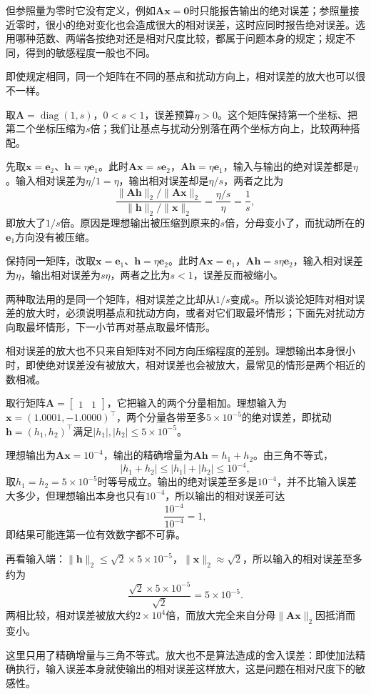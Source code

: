 但参照量为零时它没有定义，例如$\bm A\bm x=\bm0$时只能报告输出的绝对误差；参照量接近零时，很小的绝对变化也会造成很大的相对误差，这时应同时报告绝对误差。选用哪种范数、两端各按绝对还是相对尺度比较，都属于问题本身的规定；规定不同，得到的敏感程度一般也不同。

即使规定相同，同一个矩阵在不同的基点和扰动方向上，相对误差的放大也可以很不一样。
\begin{example}[对角矩阵的两种基点]
\label{ex:ls-diagonal-relative-error-basepoints}
取$\bm A=\operatorname{diag}(1,s)$，$0<s<1$，误差预算$\eta>0$。这个矩阵保持第一个坐标、把第二个坐标压缩为$s$倍；我们让基点与扰动分别落在两个坐标方向上，比较两种搭配。

先取$\bm x=\bm e_2$、$\bm h=\eta\bm e_1$。此时$\bm A\bm x=s\bm e_2$，$\bm A\bm h=\eta\bm e_1$，输入与输出的绝对误差都是$\eta$。输入相对误差为$\eta/1=\eta$，输出相对误差却是$\eta/s$，两者之比为
\[
 \frac{\lVert\bm A\bm h\rVert_2/\lVert\bm A\bm x\rVert_2}{\lVert\bm h\rVert_2/\lVert\bm x\rVert_2}
 =\frac{\eta/s}{\eta}=\frac1s ,
\]
即放大了$1/s$倍。原因是理想输出被压缩到原来的$s$倍，分母变小了，而扰动所在的$\bm e_1$方向没有被压缩。

保持同一矩阵，改取$\bm x=\bm e_1$、$\bm h=\eta\bm e_2$。此时$\bm A\bm x=\bm e_1$，$\bm A\bm h=s\eta\bm e_2$，输入相对误差为$\eta$，输出相对误差为$s\eta$，两者之比为$s<1$，误差反而被缩小。
\end{example}
两种取法用的是同一个矩阵，相对误差之比却从$1/s$变成$s$。所以谈论矩阵对相对误差的放大时，必须说明基点和扰动方向，或者对它们取最坏情形；下面先对扰动方向取最坏情形，下一小节再对基点取最坏情形。

相对误差的放大也不只来自矩阵对不同方向压缩程度的差别。理想输出本身很小时，即使绝对误差没有被放大，相对误差也会被放大，最常见的情形是两个相近的数相减。
\begin{example}[加法中的抵消]
\label{ex:ls-cancellation-relative-error}
取行矩阵$\bm A=\begin{bmatrix}1&1\end{bmatrix}$，它把输入的两个分量相加。理想输入为$\bm x=(1.0001,-1.0000)^\top$，两个分量各带至多$5\times10^{-5}$的绝对误差，即扰动$\bm h=(h_1,h_2)^\top$满足$|h_1|,|h_2|\leq5\times10^{-5}$。

理想输出为$\bm A\bm x=10^{-4}$，输出的精确增量为$\bm A\bm h=h_1+h_2$。由三角不等式，
\[
 |h_1+h_2|\leq|h_1|+|h_2|\leq10^{-4},
\]
取$h_1=h_2=5\times10^{-5}$时等号成立。输出的绝对误差至多是$10^{-4}$，并不比输入误差大多少，但理想输出本身也只有$10^{-4}$，所以输出的相对误差可达
\[
 \frac{10^{-4}}{10^{-4}}=1 ,
\]
即结果可能连第一位有效数字都不可靠。

再看输入端：$\lVert\bm h\rVert_2\leq\sqrt2\times5\times10^{-5}$，$\lVert\bm x\rVert_2\approx\sqrt2$，所以输入的相对误差至多约为
\[
 \frac{\sqrt2\times5\times10^{-5}}{\sqrt2}=5\times10^{-5}.
\]
两相比较，相对误差被放大约$2\times10^4$倍，而放大完全来自分母$\lVert\bm A\bm x\rVert_2$因抵消而变小。
\end{example}
这里只用了精确增量与三角不等式。放大也不是算法造成的舍入误差：即使加法精确执行，输入误差本身就使输出的相对误差这样放大，这是问题在相对尺度下的敏感性。

